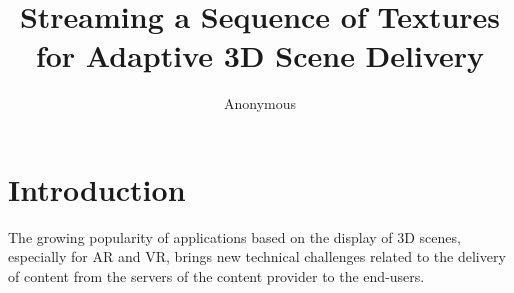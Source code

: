 \documentclass{vgtc}                          %
\title{Streaming a Sequence of Textures for Adaptive 3D Scene Delivery}
\author{Anonymous}
\begin{document}
\maketitle

\section{Introduction}

The growing popularity of applications based on the display of 3D scenes, especially for \gls{AR}
and \gls{VR}, brings new technical challenges related to the delivery of content from the servers 
of the content provider to the end-users.






\end{document}
